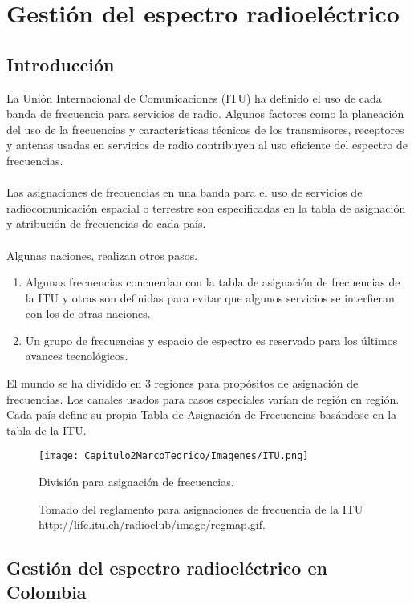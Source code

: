 \section{Gestión del espectro radioeléctrico}

\subsection{Introducci\'on}

La Unión Internacional de Comunicaciones (ITU) \cite{ITU} ha definido el uso de cada banda de frecuencia para servicios de radio. Algunos factores como la planeación del uso de la frecuencias y características técnicas de los transmisores, receptores y antenas usadas en servicios de radio contribuyen al uso eficiente del espectro de frecuencias.
\\ \\
Las asignaciones de frecuencias en una banda para el uso de servicios de radiocomunicación espacial o terrestre son especificadas en la tabla de asignación y atribución de frecuencias de cada país.
\\ \\
Algunas naciones, realizan otros pasos.

\begin{enumerate}
\item Algunas frecuencias concuerdan con la tabla de asignación de frecuencias de la ITU y otras son definidas para evitar que algunos servicios se interfieran con los de otras naciones.
\item Un grupo de frecuencias y espacio de espectro es reservado para los últimos avances tecnológicos.
\end{enumerate}

El mundo se ha dividido en 3 regiones para propósitos de asignación de frecuencias. Los canales usados para casos especiales varían de región en región. Cada país define su propia Tabla de Asignación de Frecuencias basándose en la tabla de la ITU. \\

\begin{figure}[H]
	\centering
	\texttt{[image: Capitulo2MarcoTeorico/Imagenes/ITU.png]}
	\caption{División para asignación de frecuencias.}
	\caption*{Tomado del reglamento para asignaciones de frecuencia de la ITU \url{http://life.itu.ch/radioclub/image/regmap.gif}.}
	\label{fig:disitu}	
\end{figure}

\subsection{Gestión del espectro radioeléctrico en Colombia}


